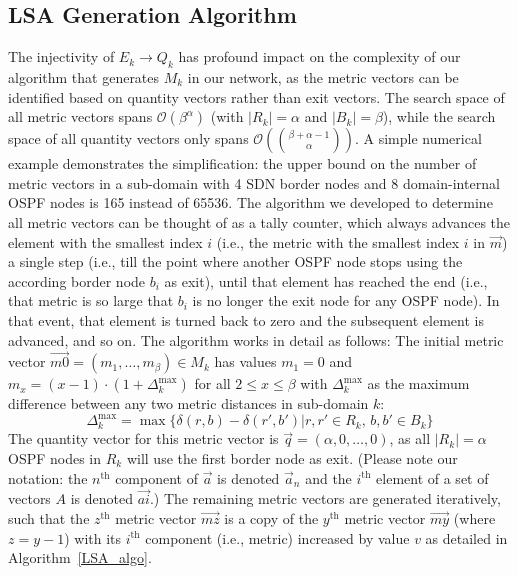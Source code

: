 \documentclass[journal]{IEEEtran}
\begin{document}
\subsection{LSA Generation Algorithm}\label{math_lsa}
The injectivity of $E_k \rightarrow Q_k$ has profound impact on the complexity of our algorithm that generates $M_k$ in our network, as the metric vectors can be identified based on quantity vectors rather than exit vectors. The search space of all metric vectors spans $\mathcal{O}(\beta^\alpha)$ (with $|R_k|=\alpha$ and $|B_k|=\beta$), while the search space of all quantity vectors only spans $\mathcal{O}(\binom{\beta+\alpha-1}{\alpha})$. A simple numerical example demonstrates the simplification: the upper bound on the number of metric vectors in a sub-domain with 4 SDN border nodes and 8 domain-internal OSPF nodes is 165 instead of 65536. The algorithm we developed to determine all metric vectors can be thought of as a tally counter, which always advances the element with the smallest index $i$ (i.e., the metric with the smallest index $i$ in $\vec{m}$) a single step (i.e., till the point where another OSPF node stops using the according border node $b_i$ as exit), until that element has reached the end (i.e., that metric is so large that $b_i$ is no longer the exit node for any OSPF node). In that event, that element is turned back to zero and the subsequent element is advanced, and so on. The algorithm works in detail as follows: The initial metric vector $\vec{m0}= (m_1,\ldots , m_\beta) \in M_k$ has values $m_1=0$ and $m_x=(x-1)\cdot (1+\Delta_k^\text{max})$ for all $2\leq x\leq\beta$ with $\Delta_k^\text{max}$ as the maximum difference between any two metric distances in sub-domain $k$:
\[
\Delta_k^\text{max} = \max\{\delta(r,b)-\delta(r',b') | r,r'\in R_k, \, b,b'\in B_k\}
\]
The quantity vector for this metric vector is $\vec{q}=(\alpha,0,\ldots,0)$, as all $|R_k| = \alpha$ OSPF nodes in $R_k$ will use the first border node as exit. (Please note our notation: the $n^\text{th}$ component of $\vec{a}$ is denoted $\vec{a}_n$ and the $i^\text{th}$ element of a set of vectors $A$ is denoted $\vec{ai}$.) The remaining metric vectors are generated iteratively, such that the $z^\text{th}$ metric vector $\vec{mz}$ is a copy of the $y^\text{th}$ metric vector $\vec{my}$ (where $z=y-1$) with its $i^\text{th}$ component (i.e., metric) increased by value $v$ as detailed in Algorithm~\ref{LSA_algo}.
\end{document}

